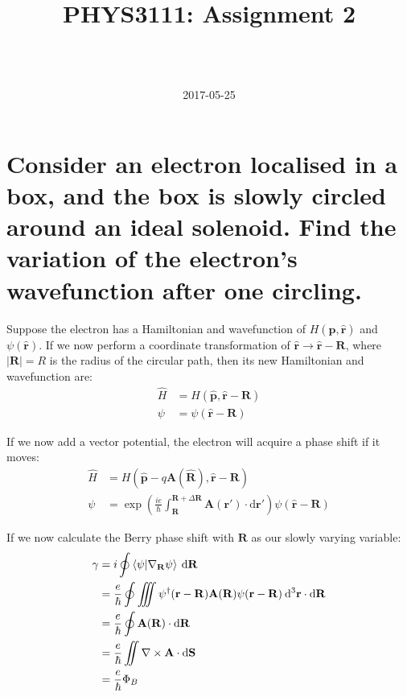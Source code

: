 \documentclass[a4paper]{scrartcl}
\begin{document}
\title{PHYS3111: Assignment 2}
\author{ \\ \\ }
\date{2017-05-25}
\maketitle

\section{Consider an electron localised in a box, and the box is slowly circled around an ideal solenoid. Find the variation of the electron's wavefunction after one circling.}
Suppose the electron has a Hamiltonian and wavefunction of \(H(\hat{\mathbf{p}}, \hat{\mathbf{r}})\) and \(\psi(\hat{\mathbf{r}})\). If we now perform a coordinate transformation of \(\hat{\mathbf{r}} \to \hat{\mathbf{r}} - \mathbf{R}\), where \(|\mathbf{R}| = R\) is the radius of the circular path, then its new Hamiltonian and wavefunction are:
\begin{align*}
    \hat{H} &= H(\hat{\mathbf{p}}, \hat{\mathbf{r}} - \mathbf{R}) \\
    \psi &= \psi(\hat{\mathbf{r}} - \mathbf{R})
\end{align*}

If we now add a vector potential, the electron will acquire a phase shift if it moves:
\begin{align*}
    \hat{H} &= H(\hat{\mathbf{p}} - q \mathbf{A}(\hat{\mathbf{R}}), \hat{\mathbf{r}} - \mathbf{R}) \\
    \psi &= \exp\left(\frac{i e}{\hbar} \int_\mathbf{R}^{\mathbf{R} + \Delta \mathbf{R}} \mathbf{A}(\mathbf{r}') \cdot \mathrm{d} \mathbf{r}'\right) \psi(\hat{\mathbf{r}} - \mathbf{R})
\end{align*}

If we now calculate the Berry phase shift with \(\mathbf{R}\) as our slowly varying variable:
\begin{align*}
    \gamma &= i \oint \braket{\psi | \nabla_\mathbf{R} \psi} \:\mathrm{d} \mathbf{R} \\
    &= \frac{e}{\hbar} \oint \iiint \psi^\dagger(\mathbf{r} - \mathbf{R}) \mathbf{A}(\mathbf{R}) \psi(\mathbf{r} - \mathbf{R}) \:\mathrm{d}^3 \mathbf{r} \cdot \mathrm{d} \mathbf{R} \\
    &= \frac{e}{\hbar} \oint \mathbf{A}(\mathbf{R}) \cdot \mathrm{d} \mathbf{R} \\
    &= \frac{e}{\hbar} \iint \nabla \times \mathbf{A} \cdot \mathrm{d} \mathbf{S} \\
    &= \frac{e}{\hbar} \Phi_B
\end{align*}
\end{document}
